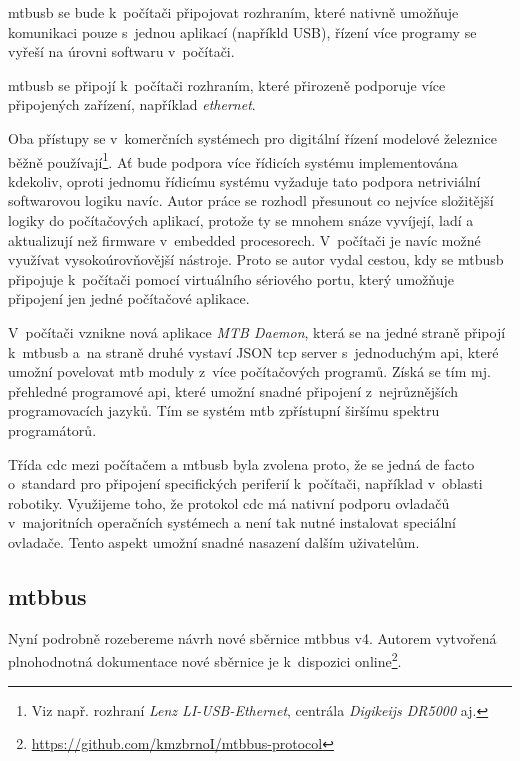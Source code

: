 \begin{compactenum}
\item \gls{mtbusb} se bude k~počítači připojovat rozhraním, které
	nativně umožňuje komunikaci pouze s~jednou aplikací (napříkld USB), řízení
	více programy se vyřeší na úrovni softwaru v~počítači.
\item \gls{mtbusb} se připojí k~počítači rozhraním, které přirozeně
	podporuje více připojených zařízení, například \textit{ethernet}.
\end{compactenum}

Oba přístupy se v~komerčních systémech pro digitální řízení modelové železnice
běžně používají\footnote{Viz např. rozhraní \textit{Lenz LI-USB-Ethernet}, centrála
\textit{Digikeijs DR5000} aj.}.
Ať bude podpora více řídicích systému implementována kdekoliv, oproti jednomu
řídicímu systému vyžaduje tato podpora netriviální softwarovou logiku navíc.
Autor práce se rozhodl přesunout co nejvíce složitější logiky do počítačových
aplikací, protože ty se mnohem snáze vyvíjejí, ladí a aktualizují než
firmware v~embedded procesorech. V~počítači je navíc možné využívat
vysokoúrovňovější nástroje. Proto se autor vydal cestou, kdy se
\gls{mtbusb} připojuje k~počítači pomocí virtuálního sériového portu, který
umožňuje připojení jen jedné počítačové aplikace.

V~počítači vznikne nová aplikace \textit{MTB Daemon}, která se na jedné
straně připojí k~\gls{mtbusb} a~na straně druhé vystaví JSON \gls{tcp}
server s~jednoduchým \gls{api}, které umožní povelovat \gls{mtb} moduly z~více
počítačových programů. Získá se tím mj. přehledné programové \gls{api}, které
umožní snadné připojení z~nejrůznějších programovacích jazyků.
Tím se systém \gls{mtb} zpřístupní širšímu spektru programátorů.

Třída \gls{cdc} mezi počítačem a \gls{mtbusb} byla zvolena proto, že se jedná
de facto o~standard pro připojení specifických periferií k~počítači, například
v~oblasti robotiky. Využijeme toho, že protokol \gls{cdc} má nativní
podporu ovladačů v~majoritních operačních systémech a není tak nutné instalovat
speciální ovladače. Tento aspekt umožní snadné nasazení dalším uživatelům.

\subsection{\gls{mtbbus}}

Nyní podrobně rozebereme návrh nové sběrnice \gls{mtbbus} v4. Autorem vytvořená
plnohodnotná dokumentace nové sběrnice je k~dispozici
online\footnote{\url{https://github.com/kmzbrnoI/mtbbus-protocol}}.


